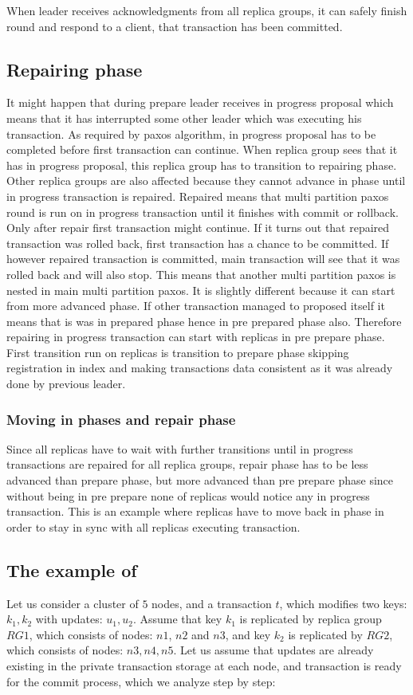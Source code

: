 When leader receives acknowledgments from all replica groups, it can safely finish \mpp round and respond to a client, that transaction has been committed.


\subsection{Repairing phase}
It might happen that during prepare leader receives in progress proposal which means that it has interrupted some other leader which was executing his transaction. As required by paxos algorithm, in progress proposal has to be completed before first transaction can continue. When replica group sees that it has in progress proposal, this replica group has to transition to repairing phase. 
Other replica groups are also affected because they cannot advance in phase until in progress transaction is repaired. Repaired means that multi partition paxos round is run on in progress transaction until it finishes with commit or rollback. Only after repair first transaction might continue. If it turns out that repaired transaction was rolled back, first transaction has a chance to be committed. If however repaired transaction is committed, main transaction will see that it was rolled back and will also stop.
This means that another multi partition paxos is nested in main multi partition paxos. It is slightly different because it can start from more advanced phase.
If other transaction managed to proposed itself it means that is was in prepared phase hence in pre prepared phase also. Therefore repairing in progress transaction can start with replicas in pre prepare phase. First transition run on replicas is transition to prepare phase skipping registration in index and making transactions data consistent as it was already done by previous leader.


\subsubsection{Moving in phases and repair phase}
Since all replicas have to wait with further transitions until in progress transactions are repaired for all replica groups, repair phase has to be less advanced than prepare phase, but more advanced than pre prepare phase since without being in pre prepare none of replicas would notice any in progress transaction. This is an example where replicas have to move back in phase in order to stay in sync with all replicas executing transaction.


\subsection{The example of \mpp}
Let us consider a cluster of $5$ nodes, and a transaction $t$, which modifies two keys: $k_{1}, k_{2}$ with updates: $u_{1}, u_{2}$. Assume that key $k_{1}$ is replicated by replica group $RG1$, which consists of nodes: $n1$, $n2$ and $n3$, and key $k_{2}$ is replicated by $RG2$, which consists of nodes: $n3, n4, n5$.
Let us assume that updates are already existing in the private transaction storage at each node, and transaction is ready for the commit process, which we analyze step by step:



